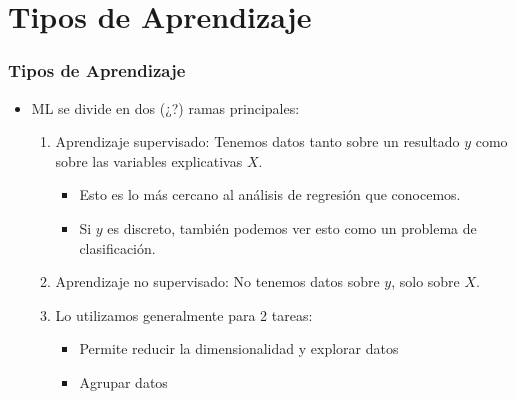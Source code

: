 \documentclass[
  shownotes,
  xcolor={svgnames},
  hyperref={colorlinks,citecolor=DarkBlue,linkcolor=DarkRed,urlcolor=DarkBlue}
  , aspectratio=169]{beamer}
\begin{document}
\section{Tipos de Aprendizaje}
 \begin{frame}[noframenumbering]
\tableofcontents[currentsubsection]

\end{frame}
\begin{frame}
\frametitle{Tipos de Aprendizaje}
\begin{itemize}


\item ML se divide en dos (¿?) ramas principales:
\medskip
  \begin{enumerate}

  \item Aprendizaje supervisado: Tenemos datos tanto sobre un resultado $y$ como sobre las variables explicativas $X$.
    \begin{itemize}
      \item Esto es lo más cercano al análisis de regresión que conocemos. 
      \item Si $y$ es discreto, también podemos ver esto como un problema de clasificación.
      
    \end{itemize}


  \pause
  \item  Aprendizaje no supervisado: No tenemos datos sobre $y$, solo sobre $X$.
  \item Lo utilizamos generalmente para 2 tareas:
  \begin{itemize}
    \item Permite reducir la dimensionalidad y explorar datos
    \item Agrupar datos
  \end{itemize}

  \end{enumerate}
\end{itemize}
\end{frame}

\end{document}
